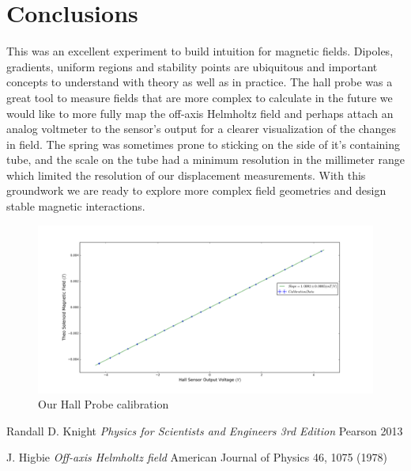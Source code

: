 \documentclass[aps,twocolumn,secnumarabic,balancelastpage,amsmath,amssymb,nofootinbib,floatfix]{revtex4-1}
\begin{document}
\section{Conclusions}
This was an excellent experiment to build intuition for magnetic fields. Dipoles,  gradients, uniform regions and stability points are ubiquitous and important concepts to understand with theory as well as in practice. The hall probe was a great tool to measure fields that are more complex to calculate in the future we would like to more fully map the off-axis Helmholtz field and perhaps attach an analog voltmeter to the sensor's output for a clearer visualization of the changes in field. The spring was sometimes prone to sticking on the side of it's containing tube, and the scale on the tube had a minimum resolution in the millimeter range which limited the resolution of our displacement measurements. With this groundwork we are ready to explore more complex field geometries and design stable magnetic interactions.

\begin{turnpage}
\begin{figure}[here]
\includegraphics[height=0.77\textwidth]{../DataValidation/calibrationPlot}
\caption{Our Hall Probe calibration}
\label{apparatus}
\end{figure}
\end{turnpage}

\begin{thebibliography}{9}

	
	Randall D. Knight
	\emph{Physics for Scientists and Engineers 3rd Edition}
	Pearson 2013
	
	J. Higbie
	\emph{Off-axis Helmholtz field}
	American Journal of Physics 46, 1075 (1978)

	
	
\end{thebibliography}
\end{document}

